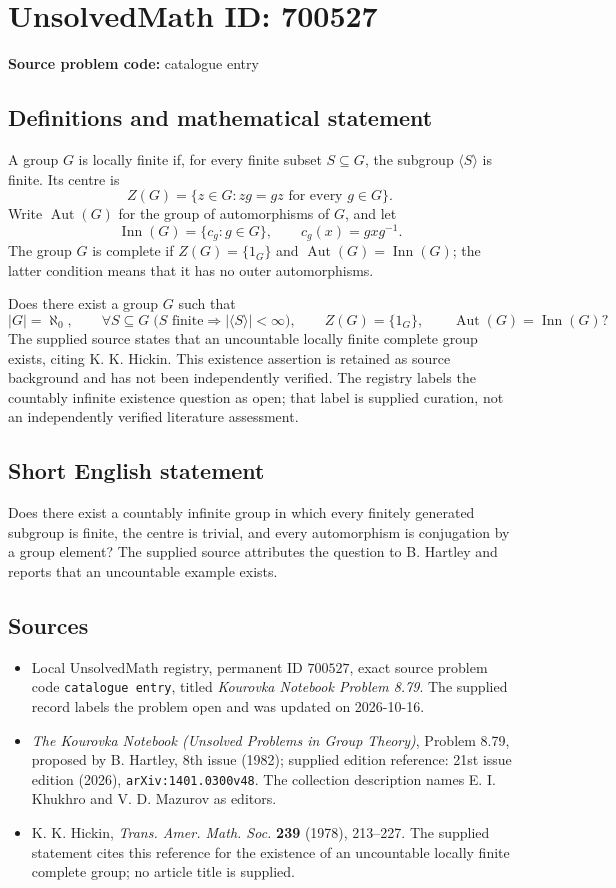 \documentclass[11pt]{article}
\begin{document}
\section*{UnsolvedMath ID: 700527}
\textbf{Source problem code:} catalogue entry
\subsection{Definitions and mathematical statement}
A group \(G\) is locally finite if, for every finite subset \(S\subseteq G\), the subgroup \(\langle S\rangle\) is finite. Its centre is
\[
Z(G)=\{z\in G: zg=gz\text{ for every }g\in G\}.
\]
Write \(\operatorname{Aut}(G)\) for the group of automorphisms of \(G\), and let
\[
\operatorname{Inn}(G)=\{c_g:g\in G\},\qquad c_g(x)=gxg^{-1}.
\]
The group \(G\) is complete if \(Z(G)=\{1_G\}\) and \(\operatorname{Aut}(G)=\operatorname{Inn}(G)\); the latter condition means that it has no outer automorphisms.

Does there exist a group \(G\) such that
\[
|G|=\aleph_0,\qquad
\forall S\subseteq G\;\bigl(S\text{ finite}\Longrightarrow |\langle S\rangle|<\infty\bigr),\qquad
Z(G)=\{1_G\},\qquad
\operatorname{Aut}(G)=\operatorname{Inn}(G)?
\]
The supplied source states that an uncountable locally finite complete group exists, citing K. K. Hickin. This existence assertion is retained as source background and has not been independently verified. The registry labels the countably infinite existence question as open; that label is supplied curation, not an independently verified literature assessment.
\subsection{Short English statement}
Does there exist a countably infinite group in which every finitely generated subgroup is finite, the centre is trivial, and every automorphism is conjugation by a group element? The supplied source attributes the question to B. Hartley and reports that an uncountable example exists.
\subsection{Sources}
\begin{itemize}
\item Local UnsolvedMath registry, permanent ID \(700527\), exact source problem code \texttt{catalogue entry}, titled \emph{Kourovka Notebook Problem 8.79}. The supplied record labels the problem open and was updated on 2026-10-16.
\item \emph{The Kourovka Notebook (Unsolved Problems in Group Theory)}, Problem 8.79, proposed by B. Hartley, 8th issue (1982); supplied edition reference: 21st issue edition (2026), \texttt{arXiv:1401.0300v48}. The collection description names E. I. Khukhro and V. D. Mazurov as editors.
\item K. K. Hickin, \emph{Trans. Amer. Math. Soc.} \textbf{239} (1978), 213--227. The supplied statement cites this reference for the existence of an uncountable locally finite complete group; no article title is supplied.
\end{itemize}
\end{document}
